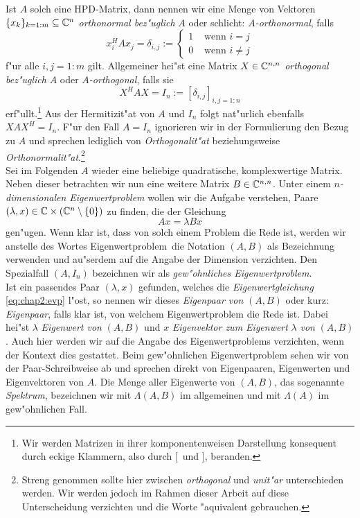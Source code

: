Ist $A$ solch eine HPD-Matrix,
dann nennen wir eine Menge von Vektoren $\{x_k\}_{k=1:m}\subseteq\mathbb{C}^n$ \emph{orthonormal
bez"uglich} $A$ oder schlicht: \emph{$A$-orthonormal}, falls
\[
x_i^H A x_j = \delta_{i,j} := \begin{cases}
1 & \text{ wenn } i=j \\
0 & \text{ wenn } i\neq j
\end{cases}
\]
f"ur alle $i,j = 1:m$ gilt. Allgemeiner hei"st eine Matrix $X\in\mathbb{C}^{n,n}$ \emph{orthogonal bez"uglich} $A$ oder \emph{$A$-orthogonal}, falls sie
\[
X^H A X = I_n := [\delta_{i,j}]_{i,j=1:n}
\]
erf"ullt.\footnote{Wir werden Matrizen in ihrer komponentenweisen Darstellung konsequent durch eckige Klammern, also durch \glqq$[$\grqq\ und \glqq$]$\grqq, beranden.} Aus der Hermitizit"at von $A$ und $I_n$ folgt nat"urlich ebenfalls $XAX^H = I_n$. F"ur den Fall $A=I_n$ ignorieren wir in der Formulierung den Bezug zu $A$ und sprechen lediglich von \emph{Orthogonalit"at} beziehungsweise \emph{Orthonormalit"at}.\footnote{Streng genommen sollte hier zwischen \emph{orthogonal} und \emph{unit"ar} unterschieden werden. Wir werden jedoch im Rahmen dieser Arbeit auf diese Unterscheidung verzichten und die Worte "aquivalent gebrauchen.}\\

Sei im Folgenden $A$ wieder eine beliebige quadratische, komplexwertige Matrix. Neben dieser betrachten wir nun eine weitere Matrix $B\in\mathbb{C}^{n,n}$.
Unter einem \emph{$n$-dimensionalen Eigenwertproblem} wollen wir die Aufgabe verstehen, Paare $(\lambda,x)\in\mathbb{C}\times(\mathbb{C}^n \setminus\{0\})$ zu finden, die der Gleichung
\begin{equation}\label{eq:chap2:evp}
Ax = \lambda Bx
\end{equation}
gen"ugen. Wenn klar ist, dass von solch einem Problem die Rede ist, werden wir anstelle des Wortes \glqq Eigenwertproblem\grqq\ die Notation $(A,B)$ als Bezeichnung verwenden und au"serdem auf die Angabe der Dimension verzichten. Den Spezialfall $(A,I_n)$ bezeichnen wir als \emph{gew"ohnliches Eigenwertproblem}.\\

Ist ein passendes Paar $(\lambda,x)$ gefunden, welches die \emph{Eigenwertgleichung} \eqref{eq:chap2:evp} l"ost, so nennen wir dieses \emph{Eigenpaar von} $(A,B)$ oder kurz: \emph{Eigenpaar}, falls klar ist, von welchem Eigenwertproblem die Rede ist.
Dabei hei"st $\lambda$ \emph{Eigenwert von} $(A,B)$ und $x$ \emph{Eigenvektor zum Eigenwert} $\lambda$ \emph{von} $(A,B)$. Auch hier werden wir auf die Angabe des Eigenwertproblems verzichten, wenn der Kontext dies gestattet.
Beim gew"ohnlichen Eigenwertproblem sehen wir von der Paar-Schreibweise ab und sprechen direkt von Eigenpaaren, Eigenwerten und Eigenvektoren von $A$.
Die Menge aller Eigenwerte von $(A,B)$, das sogenannte \emph{Spektrum}, bezeichnen wir mit $\Lambda(A,B)$ im allgemeinen und mit $\Lambda(A)$ im gew"ohnlichen Fall.\\

